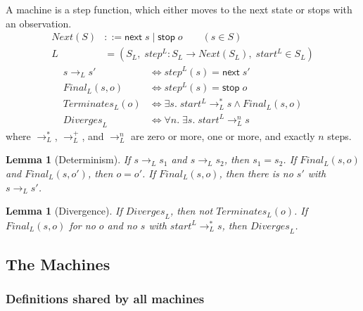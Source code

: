 \documentclass[10pt]{article}
\theoremstyle{acmplain}
\newtheorem{lemma}[theorem]{Lemma}
\newcommand{\key}[1]{\mathsf{#1}}
\newcommand{\nxt}{\key{next}\;}
\newcommand{\stp}{\key{stop}\;}
\newcommand{\step}[1]{\mathit{step}^{#1}}
\newcommand{\start}[1]{\mathit{start}^{#1}}
\newcommand{\Final}{\mathit{Final}}
\newcommand{\Term}{\mathit{Terminates}}
\newcommand{\Div}{\mathit{Diverges}}
\newcommand{\lto}{\longrightarrow}
\begin{document}
A machine is a step function, which either moves to the next state or stops with an observation.
\begin{align*}
  \mathit{Next}(S) &::= \nxt s \mid \stp o \qquad (s \in S) \\
  L &= (S_L,\; \step{L} : S_L \to \mathit{Next}(S_L),\; \start{L} \in S_L)
\end{align*}
\begin{align*}
  s \lto_L s' &\iff \step{L}(s) = \nxt s' \\
  \Final_L(s, o) &\iff \step{L}(s) = \stp o \\
  \Term_L(o) &\iff \exists s.\; \start{L} \lto_L^* s \land \Final_L(s, o) \\
  \Div_L &\iff \forall n.\; \exists s.\; \start{L} \lto_L^n s
\end{align*}
where $\lto_L^*$, $\lto_L^+$, and $\lto_L^n$ are zero or more, one or more, and exactly $n$ steps.

\begin{lemma}[Determinism]\label{lem:det}
If $s \lto_L s_1$ and $s \lto_L s_2$, then $s_1 = s_2$.
If $\Final_L(s, o)$ and $\Final_L(s, o')$, then $o = o'$.
If $\Final_L(s, o)$, then there is no $s'$ with $s \lto_L s'$.
\end{lemma}

\begin{lemma}[Divergence]\label{lem:div}
If $\Div_L$, then not $\Term_L(o)$.
If $\Final_L(s, o)$ for no $o$ and no $s$ with $\start{L} \lto_L^* s$, then $\Div_L$.
\end{lemma}

\subsection{The Machines}\label{sec:machines}

\subsubsection{Definitions shared by all machines}\label{sec:machine-shared}
\end{document}
